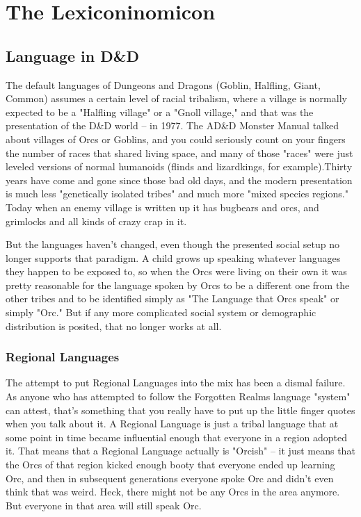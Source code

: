 \section{The Lexiconinomicon} %

\subsection{Language in D\&D}
\vspace*{-8pt}

The default languages of Dungeons and Dragons (Goblin, Halfling, Giant, Common) assumes a certain level of racial tribalism, where a village is normally expected to be a "Halfling village" or a "Gnoll village," and that was the presentation of the D\&D world -- in 1977. The AD\&D Monster Manual talked about villages of Orcs or Goblins, and you could seriously count on your fingers the number of races that shared living space, and many of those "races" were just leveled versions of normal humanoids (flinds and lizardkings, for example).Thirty years have come and gone since those bad old days, and the modern presentation is much less "genetically isolated tribes" and much more "mixed species regions." Today when an enemy village is written up it has bugbears and orcs, and grimlocks and all kinds of crazy crap in it.

But the languages haven't changed, even though the presented social setup no longer supports that paradigm. A child grows up speaking whatever languages they happen to be exposed to, so when the Orcs were living on their own it was pretty reasonable for the language spoken by Orcs to be a different one from the other tribes and to be identified simply as "The Language that Orcs speak" or simply "Orc." But if any more complicated social system or demographic distribution is posited, that no longer works at all.

\subsubsection{Regional Languages}

The attempt to put Regional Languages into the mix has been a dismal failure. As anyone who has attempted to follow the Forgotten Realms language "system" can attest, that's something that you really have to put up the little finger quotes when you talk about it. A Regional Language is just a tribal language that at some point in time became influential enough that everyone in a region adopted it. That means that a Regional Language actually is "Orcish" -- it just means that the Orcs of that region kicked enough booty that everyone ended up learning Orc, and then in subsequent generations everyone spoke Orc and didn't even think that was weird. Heck, there might not be any Orcs in the area anymore. But everyone in that area will still speak Orc.

